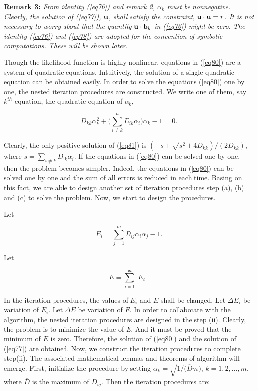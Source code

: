 \documentclass [18pt]{article}
\begin{document}
\textbf{Remark 3:} \textit{From identity (\ref{eq76}) and remark 2, }$\alpha _k $\textit{ must be nonnegative. Clearly, the solution of (\ref{eq77}), }${\rm {\bf u}}$\textit{, shall satisfy the constraint, }${\rm {\bf u}} \cdot {\rm {\bf
u}} = r$\textit{. It is not necessary to worry about that the quantity }${\rm {\bf u}} \cdot {\rm {\bf b}}_k $\textit{ in (\ref{eq76}) might be zero. The identity (\ref{eq76}) and (\ref{eq78}) are adopted for the convention of symbolic computations. These will be shown later.}

Though the likelihood function is highly nonlinear, equations in (\ref{eq80}) are a
system of quadratic equations. Intuitively, the solution of a single
quadratic equation can be obtained easily. In order to solve the equations
(\ref{eq80}) one by one, the nested iteration procedures are constructed. We write
one of them, say $k^{th}$ equation, the quadratic equation of $\alpha _k $,


\begin{equation}
\label{eq81}
D_{kk} \alpha _k^2 + (\sum\limits_{i \ne k}^n {D_{ik} \alpha _i )\alpha _k -
1 = 0} .
\end{equation}



Clearly, the only positive solution of (\ref{eq81}) is $( - s + \sqrt {s^2 + 4D_{kk}
} ) / (2D_{kk} ),$ where $s = \sum\limits_{i \ne k} {D_{ik} \alpha _i } $. If
the equations in (\ref{eq80}) can be solved one by one, then the problem becomes
simpler. Indeed, the equations in (\ref{eq80}) can be solved one by one and the sum
of all errors is reduced in each time. Basing on this fact, we are able to
design another set of iteration procedures step (a), (b) and (c) to solve
the problem. Now, we start to design the procedures.

Let


\begin{equation}
\label{eq82}
E_i = \sum\limits_{j = 1}^m {D_{ij} \alpha _i \alpha _j } - 1.
\end{equation}



Let


\begin{equation}
\label{eq83}
E = \sum\limits_{i = 1}^m {\left| {E_i } \right|} .
\end{equation}



In the iteration procedures, the values of $E_i $ and $E$ shall be changed.
Let $\Delta E_i $ be variation of $E_i $. Let $\Delta E$ be variation of
$E$. In order to collaborate with the algorithm, the nested iteration
procedures are designed in the step (ii). Clearly, the problem is to
minimize the value of $E$. And it must be proved that the minimum of $E$ is
zero. Therefore, the solution of (\ref{eq80}) and the solution of (\ref{eq77}) are obtained.
Now, we construct the iteration procedures to complete step(ii). The
associated mathematical lemmas and theorems of algorithm will emerge. First,
initialize the procedure by setting $\alpha _k = \sqrt {1 / (\overline D m}
)$, $k = 1,2,...,m$, where $\overline D $ is the maximum of $D_{ij} $. Then
the iteration procedures are:
\end{document}
